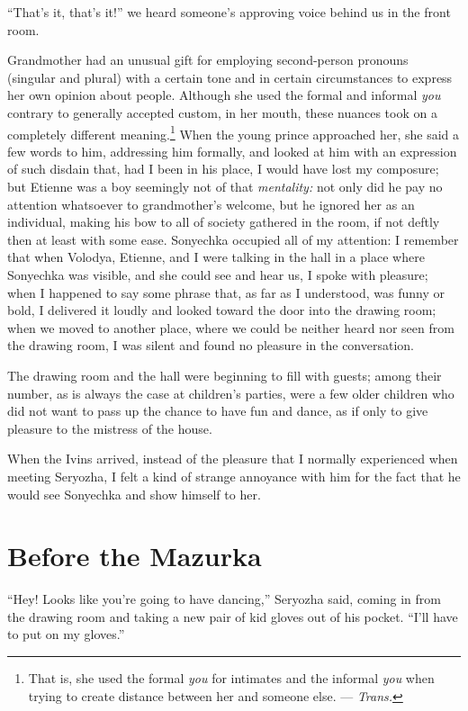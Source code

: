 ``That's it, that's it!'' we heard someone's approving voice behind us in the front room.

Grandmother had an unusual gift for employing second-person pronouns (singular and plural) with a certain tone and in certain circumstances to express her own opinion about people. Although she used the formal and informal \textit{you} contrary to generally accepted custom, in her mouth, these nuances took on a completely different meaning.\footnote{That is, she used the formal \textit{you} for intimates and the informal \textit{you} when trying to create distance between her and someone else. --- \textit{Trans.}}  When the young prince approached her, she said a few words to him, addressing him formally, and looked at him with an expression of such disdain that, had I been in his place, I would have lost my composure; but Etienne was a boy seemingly not of that \emph{mentality:} not only did he pay no attention whatsoever to grandmother's welcome, but he ignored her as an individual, making his bow to all of society gathered in the room, if not deftly then at least with some ease. Sonyechka occupied all of my attention: I remember that when Volodya, Etienne, and I were talking in the hall in a place where Sonyechka was visible, and she could see and hear us, I spoke with pleasure; when I happened to say some phrase that, as far as I understood, was funny or bold, I delivered it loudly and looked toward the door into the drawing room; when we moved to another place, where we could be neither heard nor seen from the drawing room, I was silent and found no pleasure in the conversation. 

The drawing room and the hall were beginning to fill with guests; among their number, as is always the case at children's parties, were a few older children who did not want to pass up the chance to have fun and dance, as if only to give pleasure to the mistress of the house.

When the Ivins arrived, instead of the pleasure that I normally experienced when meeting Seryozha, I felt a kind of strange annoyance with him for the fact that he would see Sonyechka and show himself to her.

\chapter{Before the Mazurka} %

``Hey! Looks like you're going to have dancing,'' Seryozha said, coming in from the drawing room and taking a new pair of kid gloves out of his pocket. ``I'll have to put on my gloves.'' %

